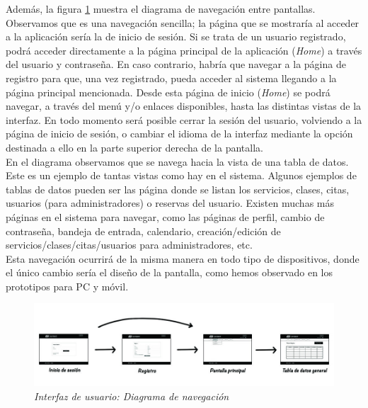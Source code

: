 Además, la figura \ref{fig:interfaz-navegacion} muestra el diagrama de navegación entre pantallas. Observamos que es una navegación sencilla; la página que se mostraría al acceder a la aplicación sería la de inicio de sesión. Si se trata de un usuario registrado, podrá acceder directamente a la página principal de la aplicación (\textit{Home}) a través del usuario y contraseña. En caso contrario, habría que navegar a la página de registro para que, una vez registrado, pueda acceder al sistema llegando a la página principal mencionada. Desde esta página de inicio (\textit{Home}) se podrá navegar, a través del menú y/o enlaces disponibles, hasta las distintas vistas de la interfaz. En todo momento será posible cerrar la sesión del usuario, volviendo a la página de inicio de sesión, o cambiar el idioma de la interfaz mediante la opción destinada a ello en la parte superior derecha de la pantalla. \\ 

En el diagrama observamos que se navega hacia la vista de una tabla de datos. Este es un ejemplo de tantas vistas como hay en el sistema. Algunos ejemplos de tablas de datos pueden ser las página donde se listan los servicios, clases, citas, usuarios (para administradores) o reservas del usuario. Existen muchas más páginas en el sistema para navegar, como las páginas de perfil, cambio de contraseña, bandeja de entrada, calendario, creación/edición de servicios/clases/citas/usuarios para administradores, etc. \\

Esta navegación ocurrirá de la misma manera en todo tipo de dispositivos, donde el único cambio sería el diseño de la pantalla, como hemos observado en los prototipos para PC y móvil.


\begin{figure}[H]
\centering
  \includegraphics[scale=.50]{img/interfaz/navegacion.jpg}
  \caption{\textit{Interfaz de usuario: Diagrama de navegación}}
  \label{fig:interfaz-navegacion}
\end{figure}

